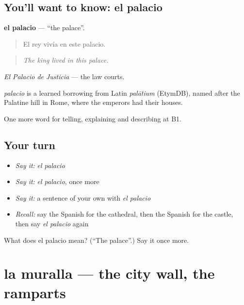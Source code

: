 \subsection*{You'll want to know: el palacio}
\textbf{el palacio} — \textquotedblleft{}the palace\textquotedblright{}.

\begin{quote}
El rey vivía en este palacio.
\end{quote}

\begin{quote}
\emph{The king lived in this palace.}
\end{quote}

\emph{El Palacio de Justicia} — the law courts.

\begin{cousinweb}
\emph{palacio} is a learned borrowing from Latin \emph{palātium} (EtymDB), named after the Palatine hill in Rome, where the emperors had their houses.
\end{cousinweb}

\begin{grammarlens}[title={What you've built}]
One more word for telling, explaining and describing at B1.
\end{grammarlens}

\subsection*{Your turn}
\begin{itemize}
\raggedright
  \item \emph{Say it:} \emph{el palacio}
  \item \emph{Say it:} \emph{el palacio}, once more
  \item \emph{Say it:} a sentence of your own with \emph{el palacio}
  \item \emph{Recall:} say the Spanish for the cathedral, then the Spanish for the castle, then say \emph{el palacio} again
\end{itemize}

\begin{tcolorbox}[breakable,colback=teal!4,colframe=teal!35!black,title={Before you move on}]
What does el palacio mean? (\textquotedblleft{}The palace\textquotedblright{}.) Say it once more.
\end{tcolorbox}
\section[la muralla]{la muralla — the city wall, the ramparts}

